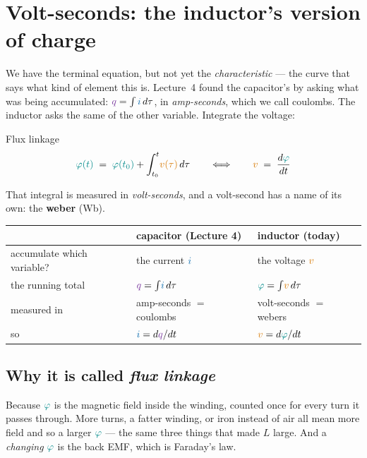 \documentclass[11pt,a4paper]{article}
\newcommand{\Icol}[1]{\textcolor{ccur}{#1}}
\newcommand{\Vcol}[1]{\textcolor{cvolt}{#1}}
\newcommand{\Qcol}[1]{\textcolor{ccharge}{#1}}
\newcommand{\Fcol}[1]{\textcolor{cflux}{#1}}
\begin{document}
\section{Volt-seconds: the inductor's version of charge}

We have the terminal equation, but not yet the \emph{characteristic} --- the curve that
says what kind of element this is. Lecture~4 found the capacitor's by asking what was being
accumulated: $\Qcol{q} = \int \Icol{i}\,d\tau$, in \emph{amp-seconds}, which we call
coulombs. The inductor asks the same of the other variable. Integrate the voltage:

\begin{definitionbox}{Flux linkage}
\vspace{-8pt}
\[
  \Fcol{\varphi(t)} \;=\; \Fcol{\varphi(t_0)} + \int_{t_0}^{t}\!\Vcol{v(\tau)}\,d\tau
  \qquad\Longleftrightarrow\qquad
  \Vcol{v} \;=\; \frac{d\Fcol{\varphi}}{dt}
\]
\vspace{-14pt}
\end{definitionbox}

That integral is measured in \emph{volt-seconds}, and a volt-second has a name of its own:
the \textbf{weber} (Wb).

\begin{center}
\small
\renewcommand{\arraystretch}{1.15}
\begin{tabular}{@{}l l l@{}}
\toprule
 & \textbf{capacitor} \footnotesize(Lecture 4) & \textbf{inductor} \footnotesize(today)\\
\midrule
accumulate which variable? & the current $\Icol{i}$ & the voltage $\Vcol{v}$\\
the running total & $\Qcol{q} = \int\!\Icol{i}\,d\tau$ & $\Fcol{\varphi} = \int\!\Vcol{v}\,d\tau$\\
measured in & amp-seconds $=$ coulombs & volt-seconds $=$ webers\\
so & $\Icol{i} = d\Qcol{q}/dt$ & $\Vcol{v} = d\Fcol{\varphi}/dt$\\
\bottomrule
\end{tabular}
\end{center}
\vspace{4pt}

\subsection{Why it is called \emph{flux linkage}}

Because $\Fcol{\varphi}$ is the magnetic field inside the winding, counted once for every
turn it passes through. More turns, a fatter winding, or iron instead of air all mean more
field and so a larger $\Fcol{\varphi}$ --- the same three things that made $L$ large. And
a \emph{changing} $\Fcol{\varphi}$ is the back EMF, which is Faraday's law.
\end{document}
